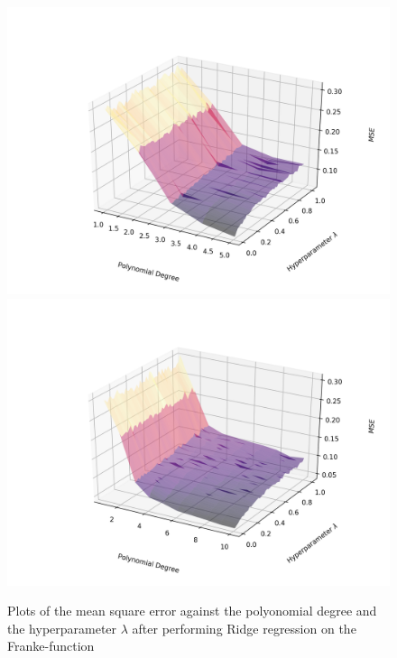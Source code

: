 \documentclass[a4paper,10pt,english]{article}
\begin{document}
\begin{figure}[H]
	\centering 
	\includegraphics[scale=0.47]{../franke_output/part_D_2.png}
	\includegraphics[scale=0.47]{../franke_output/part_D_2_highdeg.png}
	\caption{
		Plots of the mean square error against the polyonomial degree and the hyperparameter $\lambda$ after performing Ridge regression on the Franke-function 
	}
	\label{part_d2}
\end{figure}
\end{document}
